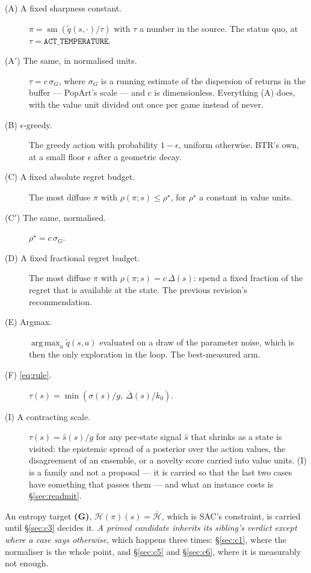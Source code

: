 \documentclass{article}
\newcommand{\h}{\mathcal{H}}
\DeclareMathOperator*{\argmax}{arg\,max}
\DeclareMathOperator{\sm}{sm}
\newcommand{\gapbar}{\overline{\Delta}}
\newcommand{\srank}{\sigma}
\newcommand{\snorm}{\sigma_{G}}
\begin{document}
\begin{description}
  \item[(A) A fixed sharpness constant.] $\pi = \sm(\tilde{q}(s,\cdot)/\tau)$ with $\tau$ a
  number in the source. The status quo, at $\tau = \texttt{ACT\_TEMPERATURE}$.
  \item[(A$'$) The same, in normalised units.] $\tau = c\,\snorm$, where $\snorm$ is a
  running estimate of the dispersion of returns in the buffer --- PopArt's scale --- and $c$ is
  dimensionless. Everything (A) does, with the value unit divided out once per game instead of
  never.
  \item[(B) $\epsilon$-greedy.] The greedy action with probability $1-\epsilon$, uniform
  otherwise. BTR's own, at a small floor $\epsilon$ after a geometric decay.
  \item[(C) A fixed absolute regret budget.] The most diffuse $\pi$ with
  $\rho(\pi;s) \le \rho^\star$, for $\rho^\star$ a constant in value units.
  \item[(C$'$) The same, normalised.] $\rho^\star = c\,\snorm$.
  \item[(D) A fixed fractional regret budget.] The most diffuse $\pi$ with
  $\rho(\pi;s) = c\,\gapbar(s)$: spend a fixed fraction of the regret that is available at the
  state. The previous revision's recommendation.
  \item[(E) Argmax.] $\argmax_a \tilde{q}(s,a)$ evaluated on a draw of the parameter noise, which
  is then the only exploration in the loop. The best-measured arm.
  \item[(F) \eqref{eq:rule}.] $\tau(s) = \min(\srank(s)/g,\ \gapbar(s)/k_0)$.
  \item[(I) A contracting scale.] $\tau(s) = \hat{s}(s)/g$ for any per-state signal $\hat{s}$
  that shrinks as a state is visited: the epistemic spread of a posterior over the action values,
  the disagreement of an ensemble, or a novelty score carried into value units. (I) is a family
  and not a proposal --- it is carried so that the last two cases have something that passes them
  --- and what an instance costs is \S\ref{sec:readmit}.
\end{description}

An entropy target \textbf{(G)}, $\h(\pi)(s) = \bar{\h}$, which is SAC's constraint, is carried
until \S\ref{sec:c3} decides it. \emph{A primed candidate inherits its sibling's verdict except
where a case says otherwise}, which happens three times: \S\ref{sec:c1}, where the normaliser is
the whole point, and \S\ref{sec:c5} and \S\ref{sec:c6}, where it is measurably not enough.
\end{document}
